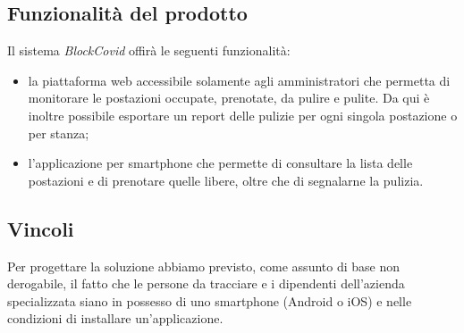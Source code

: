 \subsection{Funzionalit\`{a} del prodotto}
Il sistema \emph{BlockCovid} offir\`{a} le seguenti funzionalit\`{a}:
\begin{itemize}
    \item la piattaforma web accessibile solamente agli amministratori che permetta di monitorare le postazioni occupate, prenotate, da pulire e pulite. Da qui \`{e} inoltre possibile esportare un report delle pulizie per ogni singola postazione o per stanza;
    \item l’applicazione per smartphone che permette di consultare la lista delle postazioni e di prenotare quelle libere, oltre che di segnalarne la pulizia.
\end{itemize}

\subsection{Vincoli}
Per progettare la soluzione abbiamo previsto, come assunto di base non derogabile, il fatto che le persone
da tracciare e i dipendenti dell’azienda specializzata siano in possesso di uno smartphone (Android o iOS) e nelle condizioni di installare un’applicazione.
